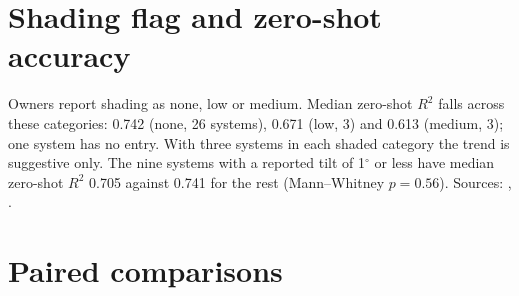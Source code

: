 \section{Shading flag and zero-shot accuracy}
\label{sec:s-shade}

Owners report shading as none, low or medium. Median zero-shot $R^2$ falls across these categories: 0.742 (none, 26 systems), 0.671 (low, 3) and 0.613 (medium, 3); one system has no entry. With three systems in each shaded category the trend is suggestive only. The nine systems with a reported tilt of 1$^\circ$ or less have median zero-shot $R^2$ 0.705 against 0.741 for the rest (Mann--Whitney $p = 0.56$). Sources: , .

\section{Paired comparisons}
\label{sec:s-paired}

